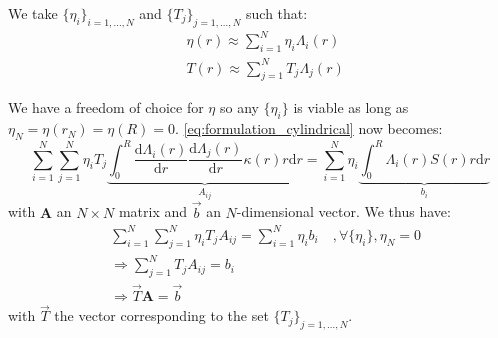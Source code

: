 We take $\{\eta_i\}_{i=1,\ldots,N}$ and $\{T_j\}_{j=1,\ldots,N}$ such that:
\begin{equation}
    \begin{aligned}
        & \eta(r) \approx \sum_{i=1}^N \eta_i \Lambda_i(r) \\
        & T(r) \approx \sum_{j=1}^N T_j \Lambda_j(r)
    \end{aligned}
\end{equation}

We have a freedom of choice for $\eta$ so any $\{\eta_i\}$ is viable as long as $\eta_N = \eta(r_N) = \eta(R) = 0$.
\autoref{eq:formulation_cylindrical} now becomes:
\begin{equation}
    \sum_{i=1}^{N} \sum_{j=1}^{N} \eta_i T_j \underbrace{\int_0^R \frac{\mathrm{d} \Lambda_i(r)}{\mathrm{d} r} \frac{\mathrm{d} \Lambda_j(r)}{\mathrm{d} r} \kappa(r)  r \mathrm{d}r}_{A_{ij}}  = \sum_{i=1}^{N} \eta_i \underbrace{\int_0^R \Lambda_i(r) S(r) r \mathrm{d}r}_{b_i}
    \label{eq:matrix_defs}
\end{equation}
with $\mathbf{A}$ an $N\times N$ matrix and $\vec{b}$ an $N$-dimensional vector. We thus have:
\begin{equation}
    \begin{aligned}
        & \sum_{i=1}^{N} \sum_{j=1}^{N} \eta_i T_j A_{ij}  = \sum_{i=1}^{N} \eta_i b_i \quad , \forall \{\eta_i\}, \eta_N = 0 \\
        & \Rightarrow \sum_{j=1}^{N} T_j A_{ij} = b_i \\
        & \Rightarrow \vec{T} \mathbf{A} = \vec{b}
    \end{aligned}
    \label{eq:system_of_equations}
\end{equation}
with $\vec{T}$ the vector corresponding to the set $\{T_j\}_{j=1,\ldots,N}$.

